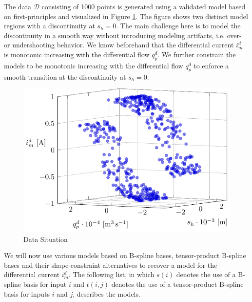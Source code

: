 The data $\mathcal{D}$ consisting of 1000 points is generated using a validated model based on first-principles and visualized in Figure \ref{fig:bosch_data_situation}. The figure shows two distinct model regions with a discontinuity at $s_h = 0$. The main challenge here is to model the discontinuity in a smooth way without introducing modeling artifacts, i.e. over- or undershooting behavior. We know beforehand that the differential current $i_m^d$ is monotonic increasing with the differential flow $q_p^d$. We further constrain the models to be monotonic increasing with the differential flow $q_p^d$ to enforce a smooth transition at the discontinuity at $s_h = 0$.

\begin{figure}[H]
	\centering
	\includegraphics{graphics/pgfplots/cha5/Bosch/data_situation.pdf} 
	\caption{Data Situation}
	\label{fig:bosch_data_situation}
\end{figure}

We will now use various models based on B-spline bases, tensor-product B-spline bases and their shape-constraint alternatives to recover a model for the differential current $i_m^d$. The following list, in which $s(i)$ denotes the use of a B-spline basis for input $i$ and $t(i,j)$ denotes the use of a tensor-product B-spline basis for inputs $i$ and $j$, describes the models.

